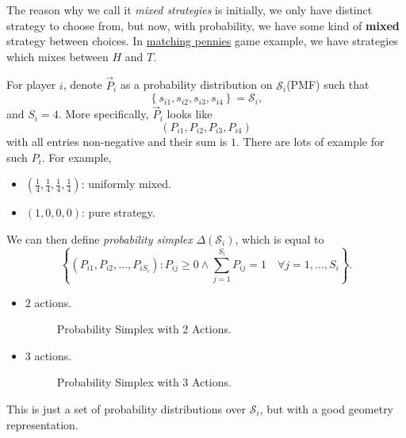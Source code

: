 \begin{prev}
	The reason why we call it \emph{mixed strategies} is initially, we only have distinct strategy to choose from, but now, with probability, we have some kind of
	\textbf{mixed} strategy between choices. In \hyperref[matching-pennies]{matching pennies} game example, we have strategies which mixes between \(H\) and \(T\).
\end{prev}

\hr

For player \(i\), denote \(\overrightarrow{P}_{i}\) as a probability distribution on \(\mathcal{S}_i\)(PMF) such that
\[
	\left\{s_{i1}, s_{i2}, s_{i3}, s_{i4}\right\} = \mathcal{S}_i,
\]
and \(S_i = 4\). More specifically, \(\overrightarrow{P}_i\) looks like
\[
	(P_{i1}, P_{i2}, P_{i3}, P_{i4})
\]
with all entries non-negative and their sum is \(1\). There are lots of example for such \(P_{i}\). For example,
\begin{itemize}
	\item \((\frac{1}{4}, \frac{1}{4}, \frac{1}{4}, \frac{1}{4})\): uniformly mixed.
	\item \((1, 0, 0, 0)\): pure strategy.
\end{itemize}

We can then define \emph{probability simplex} \(\Delta(\mathcal{S}_i )\), which is equal to
\[
	\left\{\left(P_{i1}, P_{i2}, \ldots , P_{i S_{i}}\right)\colon P_{ij}\geq 0\land \sum\limits_{j=1}^{S_i} P_{ij} = 1\quad \forall j = 1, \ldots , S_{i}\right\}.
\]
\begin{itemize}
	\item \(2\) actions.
	      \begin{figure}[H]
		      \centering
		      \caption{Probability Simplex with 2 Actions.}
		      \label{fig:probability-simplex-2actions}
	      \end{figure}
	\item \(3\) actions.
	      \begin{figure}[H]
		      \centering
		      \caption{Probability Simplex with 3 Actions.}
		      \label{fig:probability-simplex-3actions}
	      \end{figure}
\end{itemize}
\begin{intuition}
	This is just a set of probability distributions over \(\mathcal{S}_i\), but with a good geometry representation.
\end{intuition}

